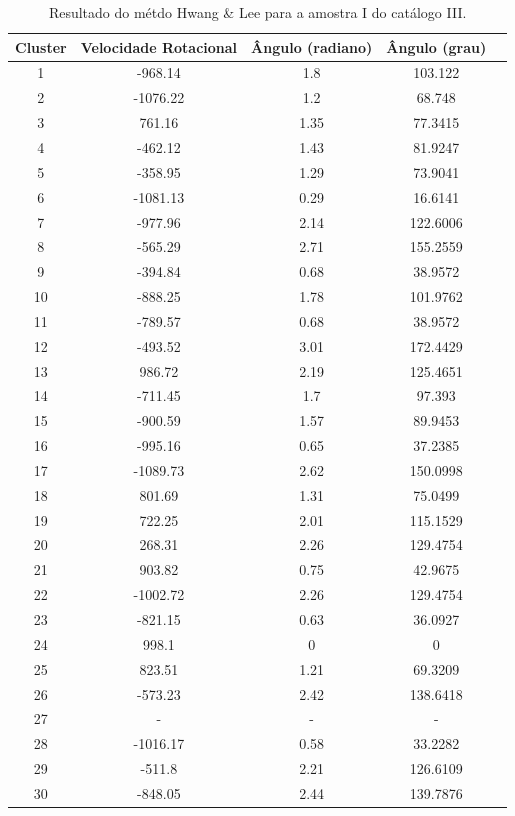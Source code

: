{\footnotesize 
\begin{longtable}{ccccc}
\caption{Resultado do métdo Hwang \& Lee para a amostra I do catálogo III.}\label{tab:rotationhwang}
\cline{1-4}
\multicolumn{1}{|l|}{\textbf{Cluster}} & \multicolumn{1}{l|}{\textbf{Velocidade Rotacional}} & \multicolumn{1}{l|}{\textbf{Ângulo (radiano)}} & \multicolumn{1}{l|}{\textbf{Ângulo (grau)}} \\ \hline
1 & -968.14 & 1.8 & 103.122 \\ 
2 & -1076.22 & 1.2 & 68.748 \\ 
3 & 761.16 & 1.35 & 77.3415 \\ 
4 & -462.12 & 1.43 & 81.9247 \\ 
5 & -358.95 & 1.29 & 73.9041 \\ 
6 & -1081.13 & 0.29 & 16.6141 \\ 
7 & -977.96 & 2.14 & 122.6006 \\ 
8 & -565.29 & 2.71 & 155.2559 \\ 
9 & -394.84 & 0.68 & 38.9572 \\ 
10 & -888.25 & 1.78 & 101.9762 \\ 
11 & -789.57 & 0.68 & 38.9572 \\ 
12 & -493.52 & 3.01 & 172.4429 \\ 
13 & 986.72 & 2.19 & 125.4651 \\ 
14 & -711.45 & 1.7 & 97.393 \\ 
15 & -900.59 & 1.57 & 89.9453 \\ 
16 & -995.16 & 0.65 & 37.2385 \\ 
17 & -1089.73 & 2.62 & 150.0998 \\ 
18 & 801.69 & 1.31 & 75.0499 \\ 
19 & 722.25 & 2.01 & 115.1529 \\ 
20 & 268.31 & 2.26 & 129.4754 \\ 
21 & 903.82 & 0.75 & 42.9675 \\ 
22 & -1002.72 & 2.26 & 129.4754 \\ 
23 & -821.15 & 0.63 & 36.0927 \\ 
24 & 998.1 & 0 & 0 \\ 
25 & 823.51 & 1.21 & 69.3209 \\ 
26 & -573.23 & 2.42 & 138.6418 \\ 
27 & - & - & -   \\ 
28 & -1016.17 & 0.58 & 33.2282 \\ 
29 & -511.8 & 2.21 & 126.6109 \\ 
30 & -848.05 & 2.44 & 139.7876 \\ 

\end{longtable}}
